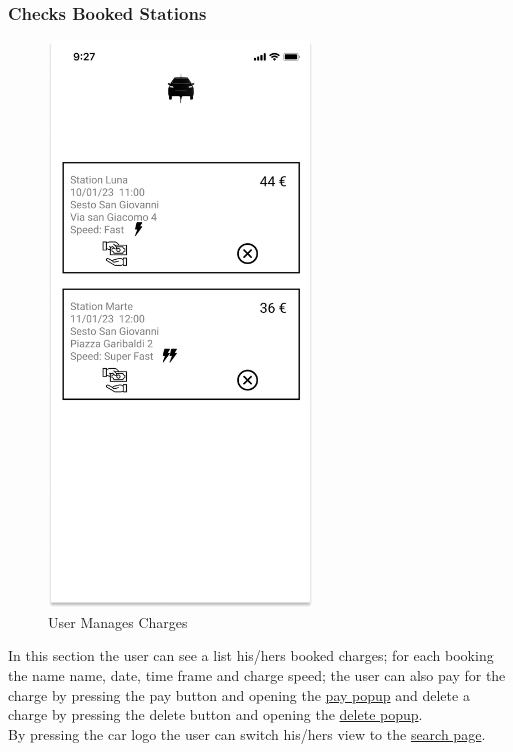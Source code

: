 \subsubsection{Checks Booked Stations}
\begin{figure}[H]
    \centering
    \includegraphics[keepaspectratio, height=15cm]{AppInterface/My Charges.png}
    \caption{User Manages Charges}
    \label{fig:myCharges}
\end{figure}
In this section the user can see a list his/hers booked charges; for each booking the name name, date, time frame and charge speed; the user can also pay for the charge by pressing the pay button and opening the \hyperref[pop:Pay]{pay popup} and delete a charge by pressing the delete button and opening the \hyperref[pop:Delete]{delete popup}.\\
By pressing the car logo the user can switch his/hers view to the \hyperref[fig:Search]{search page}.

